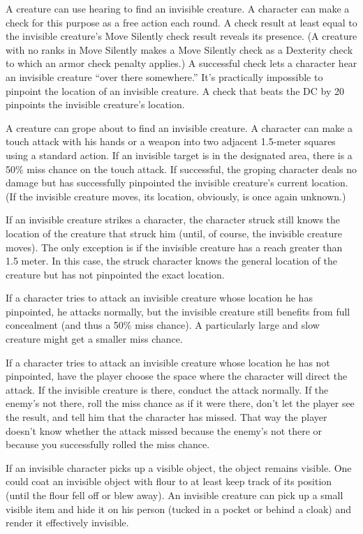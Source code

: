A creature can use hearing to find an invisible creature. A character can make a  check for this purpose as a free action each round. A  check result at least equal to the invisible creature's Move Silently check result reveals its presence. (A creature with no ranks in Move Silently makes a Move Silently check as a Dexterity check to which an armor check penalty applies.) A successful check lets a character hear an invisible creature ``over there somewhere.'' It's practically impossible to pinpoint the location of an invisible creature. A  check that beats the DC by 20 pinpoints the invisible creature's location.

A creature can grope about to find an invisible creature. A character can make a touch attack with his hands or a weapon into two adjacent 1.5-meter squares using a standard action. If an invisible target is in the designated area, there is a 50\% miss chance on the touch attack. If successful, the groping character deals no damage but has successfully pinpointed the invisible creature's current location. (If the invisible creature moves, its location, obviously, is once again unknown.)

If an invisible creature strikes a character, the character struck still knows the location of the creature that struck him (until, of course, the invisible creature moves). The only exception is if the invisible creature has a reach greater than 1.5 meter. In this case, the struck character knows the general location of the creature but has not pinpointed the exact location.

If a character tries to attack an invisible creature whose location he has pinpointed, he attacks normally, but the invisible creature still benefits from full concealment (and thus a 50\% miss chance). A particularly large and slow creature might get a smaller miss chance.

If a character tries to attack an invisible creature whose location he has not pinpointed, have the player choose the space where the character will direct the attack. If the invisible creature is there, conduct the attack normally. If the enemy's not there, roll the miss chance as if it were there, don't let the player see the result, and tell him that the character has missed. That way the player doesn't know whether the attack missed because the enemy's not there or because you successfully rolled the miss chance.

If an invisible character picks up a visible object, the object remains visible. One could coat an invisible object with flour to at least keep track of its position (until the flour fell off or blew away). An invisible creature can pick up a small visible item and hide it on his person (tucked in a pocket or behind a cloak) and render it effectively invisible.


